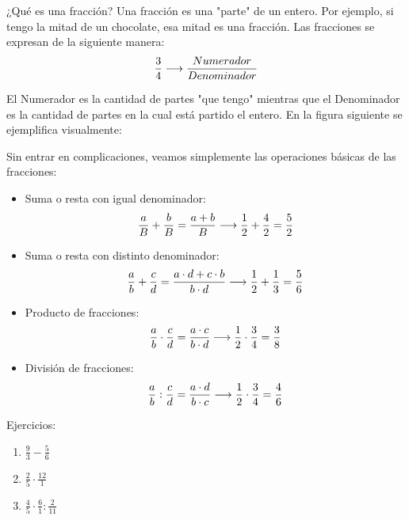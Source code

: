 ¿Qué es una fracción? Una fracción es una "parte" de un entero. Por ejemplo, si tengo la mitad de un chocolate, esa mitad es una fracción. Las fracciones se expresan de la siguiente manera:\\

\begin{equation}
    \notag
    \frac{3}{4} \longrightarrow \frac{Numerador}{Denominador}
\end{equation}


El Numerador es la cantidad de partes "que tengo" mientras que el Denominador es la cantidad de partes en la cual está partido el entero. En la figura siguiente se ejemplifica visualmente: 

\begin{figure}[H]
\centering
{}
\label{1.0}
\end{figure}

Sin entrar en complicaciones, veamos simplemente las operaciones básicas de las fracciones: \\

\begin{itemize}
    \item Suma o resta con igual denominador: 
    \begin{equation}
        \notag
         \frac{a}{B} + \frac{b}{B} = \frac{a+ b}{B} \longrightarrow \frac{1}{2} + \frac{4}{2} = \frac{5}{2}
    \end{equation}
    \item Suma o resta con distinto denominador:
    \begin{equation}
        \notag
         \frac{a}{b} + \frac{c}{d} = \frac{a\cdot d + c\cdot b}{b\cdot d} \longrightarrow \frac{1}{2} + \frac{1}{3}=\frac{5}{6}
    \end{equation}
    \item Producto de fracciones: 
    \begin{equation}
        \notag
        \frac{a}{b}\cdot \frac{c}{d}=\frac{a\cdot c }{b \cdot d} \longrightarrow \frac{1}{2}\cdot \frac{3}{4}=\frac{3}{8}
    \end{equation}
    \item División de fracciones: 
    \begin{equation}
        \notag
            \frac{a}{b} : \frac{c}{d}=\frac{a\cdot d }{b \cdot c} \longrightarrow \frac{1}{2}\cdot \frac{3}{4}=\frac{4}{6}
    \end{equation}
\end{itemize}

Ejercicios:\\

\begin{enumerate}
\renewcommand{\labelenumi}{{\theenumi})}
\item $\frac{9}{3}-\frac{5}{6}$
\item $\frac{2}{5}\cdot \frac{12}{1}$
\item $\frac{4}{5}\cdot \frac{6}{1} : \frac{2}{11}$

\end{enumerate}